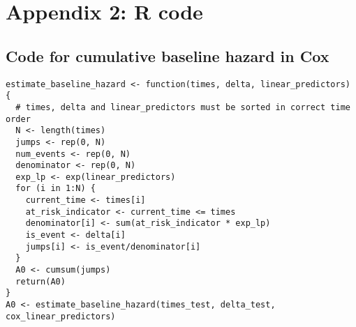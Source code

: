 \chapter{Appendix 2: R code}\label{appendix2}

\section{Code for cumulative baseline hazard in Cox}
\label{code:cumulative-baseline-hazard}
\begin{lstlisting}
estimate_baseline_hazard <- function(times, delta, linear_predictors) {
  # times, delta and linear_predictors must be sorted in correct time order
  N <- length(times)
  jumps <- rep(0, N)
  num_events <- rep(0, N)
  denominator <- rep(0, N)
  exp_lp <- exp(linear_predictors)
  for (i in 1:N) {
    current_time <- times[i]
    at_risk_indicator <- current_time <= times
    denominator[i] <- sum(at_risk_indicator * exp_lp)
    is_event <- delta[i]
    jumps[i] <- is_event/denominator[i]
  }
  A0 <- cumsum(jumps)
  return(A0)
}
A0 <- estimate_baseline_hazard(times_test, delta_test, cox_linear_predictors)
\end{lstlisting}